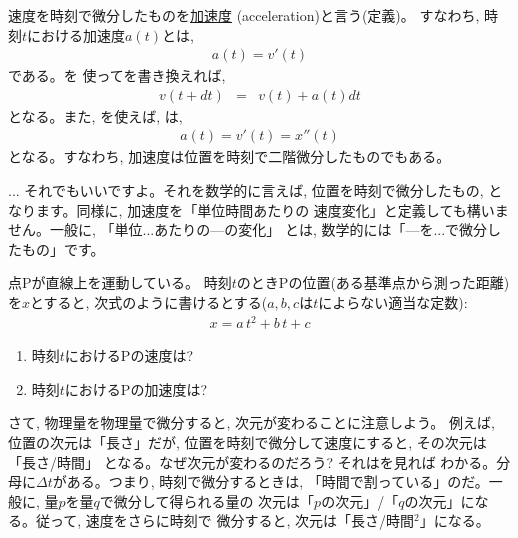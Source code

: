 速度を時刻で微分したものを\underline{加速度} (acceleration)と言う(定義)。
すなわち, 時刻$t$における加速度$a(t)$とは, 
\begin{eqnarray}a(t)=v'(t)\label{eq:ac_def2}\end{eqnarray}
である。を
使ってを書き換えれば, 
\begin{eqnarray}v(t+dt) &=& v(t) + a(t)dt\label{eq:vtdtvtatdt}
\end{eqnarray}
となる。また, を使えば, は, 
\begin{eqnarray}a(t)=v'(t)=x''(t)\label{eq:ac_def3}\end{eqnarray}
となる。すなわち, 加速度は位置を時刻で二階微分したものでもある。

\begin{faq}{\small{}... それでもいいですよ。それを数学的に言えば, 
位置を時刻で微分したもの, となります。同様に, 加速度を「単位時間あたりの
速度変化」と定義しても構いません。一般に, 「単位...あたりの---の変化」
とは, 数学的には「---を...で微分したもの」です。}\end{faq}\mv

\begin{q}\label{q:diff_velocac} 点Pが直線上を運動している。
時刻$t$のときPの位置(ある基準点から測った距離)を$x$とすると, 
次式のように書けるとする($a, b, c$は$t$によらない適当な定数):
\begin{eqnarray}
x=a\,t^2+b\,t+c\label{eq:diff_velocac03}
\end{eqnarray}
\begin{enumerate}
\item 時刻$t$におけるPの速度は? 
\item 時刻$t$におけるPの加速度は? 
\end{enumerate}
\end{q}
\vspace{0.3cm}

さて, 物理量を物理量で微分すると, 次元が変わることに注意しよう。
例えば, 位置の次元は「長さ」だが, 位置を時刻で微分して速度にすると, 
その次元は「長さ/時間」
となる。なぜ次元が変わるのだろう? それはを見れば
わかる。分母に$\Delta t$がある。つまり, 時刻で微分するときは, 
「時間で割っている」のだ。一般に, 量$p$を量$q$で微分して得られる量の
次元は「$p$の次元」/「$q$の次元」になる。従って, 速度をさらに時刻で
微分すると, 次元は「長さ/時間$^2$」になる。\hv

